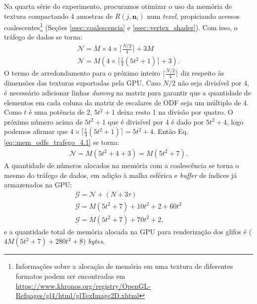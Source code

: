 Na quarta série do experimento, procuramos otimizar o uso da memória de textura compactando 4 amostras de $R(j, \mathbf{n}_i)$ num \textit{texel}, propiciando acessos coalescentes\footnote{Informações sobre a alocação de memória em uma textura de diferentes formatos podem ser encontradas em \url{https://www.khronos.org/registry/OpenGL-Refpages/gl4/html/glTexImage2D.xhtml}} (Seções \ref{ssec::coalescencia} e \ref{ssec::vertex_shader}). Com isso, o tráfego de dados se torna:
\begin{equation}
\label{eq::mem_odfs_trafego_4.1}
\begin{array}{l}
    \mathscr{N} =  M\times 4 \times \lceil\frac{N/2}{4}\rceil + 3M \\
    \mathscr{N} =  M( 4 \times \lceil \frac{1}{4}(5t^2 + 1)\rceil + 3) . %
    \end{array}
\end{equation}
O termo de arredondamento para o próximo inteiro $\lceil\frac{N/2}{4}\rceil$ diz respeito às dimensões das texturas suportadas pela GPU. Caso $N/2$ não seja divisível por 4, é necessário adicionar linhas \textit{dummy} na matriz para garantir que a quantidade de elementos em cada coluna da matriz de escalares de ODF seja um múltiplo de 4. Como $t$ é uma potência de 2, $5t^2 + 1$ deixa resto 1 na divisão por quatro. O próximo número acima de $5t^2 + 1$ que é divisível por 4 é dado por $5t^2 + 4$, logo podemos afirmar que $4 \times \lceil \frac{1}{4}(5t^2 + 1)\rceil = 5t^2 + 4$. Então Eq. \ref{eq::mem_odfs_trafego_4.1} se torna:
\begin{equation}
\label{eq::mem_odfs_trafego_4.2}
\begin{array}{l}
    \mathscr{N} =  M (5t^2 + 4 + 3) = M (5t^2 + 7).
    \end{array}
\end{equation}
A quantidade de números alocados na memória com a coalescência se torna o mesmo do tráfego de dados, em adição à malha esférica e \textit{buffer} de índices já armazenados na GPU:
\begin{equation}
\label{eq::mem_odfs_ocupancia_4.1}
\begin{array}{l}
    \mathscr{G} =  \mathscr{N} + (N + 3\tau) \\
    \mathscr{G} =   M (5t^2 + 7) + 10 t^2 + 2 + 60t^2\\
    \mathscr{G} = M(5t^2 + 7) + 70 t^2 + 2 ,
    \end{array}
\end{equation}
e a quantidade total de memória alocada na GPU para renderização dos glifos é ($4M(5t^2 + 7) + 280t^2 + 8$) \textit{bytes}.


